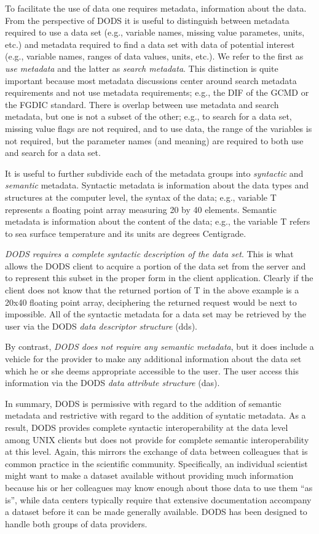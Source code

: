 \documentclass{article}
\begin{document}
To facilitate the use of data one requires metadata, information about the
data. From the perspective of DODS it is useful to distinguish between
metadata required to use a data set (e.g., variable names, missing value
parametes, units, etc.) and metadata required to find a data set with data of
potential interest (e.g., variable names, ranges of data values, units,
etc.). We refer to the first as {\em use metadata} and the latter as {\em
  search metadata}. This distinction is quite important because most metadata
discussions center around search metadata requirements and not use metadata
requirements; e.g., the \ac{DIF} of the \ac{GCMD} or the \ac{FGDIC} standard.
There is overlap between use metadata and search metadata, but one is not a
subset of the other; e.g., to search for a data set, missing value flags are
not required, and to use data, the range of the variables is not required,
but the parameter names (and meaning) are required to both use and search for
a data set.

It is useful to further subdivide each of the metadata groups into {\em
  syntactic} and {\em semantic} metadata. Syntactic metadata is information
about the data types and structures at the computer level, the syntax of the
data; e.g., variable T represents a floating point array measuring 20 by 40
elements. Semantic metadata is information about the content of the data;
e.g., the variable T refers to sea surface temperature and its units are
degrees Centigrade.

{\em DODS requires a complete syntactic description of the data set}.  This
is what allows the DODS client to acquire a portion of the data set from the
server and to represent this subset in the proper form in the client
application. Clearly if the client does not know that the returned portion of
T in the above example is a 20x40 floating point array, deciphering the
returned request would be next to impossible. All of the syntactic metadata
for a data set may be retrieved by the user via the DODS {\em data descriptor
  structure} (dds).

By contrast, {\em DODS does not require any semantic metadata}, but it does
include a vehicle for the provider to make any additional information about
the data set which he or she deems appropriate accessible to the user. The
user access this information via the DODS {\em data attribute structure}
(das).

In summary, DODS is permissive with regard to the addition of semantic
metadata and restrictive with regard to the addition of syntatic metadata. As
a result, DODS provides complete syntactic interoperability at the data level
among UNIX clients but does not provide for complete semantic
interoperability at this level. Again, this mirrors the exchange of data
between colleagues that is common practice in the scientific community.
Specifically, an individual scientist might want to make a dataset available
without providing much information because his or her colleagues may know
enough about those data to use them ``as is'', while data centers typically
require that extensive documentation accompany a dataset before it can be
made generally available. \ac{DODS} has been designed to handle both groups
of data providers.
\end{document}
